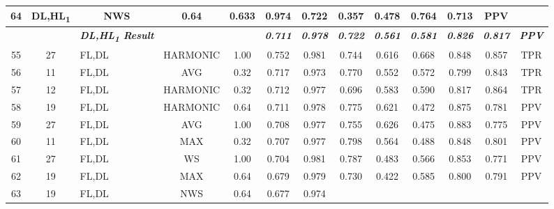\begin{table}[H]
{\begin{tabular}{cc|l|cc|c|c|c|c|c|c|c|c|}
    64 &
    DL,HL\textsubscript{1} &
    \multicolumn{1}{c|}{NWS} &
    0.64 &
    0.633 &
    0.974 &
    0.722 &
    0.357 &
    0.478 &
    0.764 &
    0.713 &
    PPV \\ \hline
   &
    \textit{\textbf{}} &
    \textit{\textbf{DL,HL\textsubscript{1} Result}} &
     &
     &
    \textit{\textbf{0.711}} &
    \textit{\textbf{0.978}} &
    \textit{\textbf{0.722}} &
    \textit{\textbf{0.561}} &
    \textit{\textbf{0.581}} &
    \textit{\textbf{0.826}} &
    \textit{\textbf{0.817}} &
    \textit{\textbf{PPV}} \\ \hline
  \multicolumn{1}{|c|}{55} &
    27 &
    FL,DL &
    \multicolumn{1}{c|}{HARMONIC} &
    1.00 &
    0.752 &
    0.981 &
    0.744 &
    0.616 &
    0.668 &
    0.848 &
    0.857 &
    TPR \\ \hline
  \multicolumn{1}{|c|}{56} &
    11 &
    FL,DL &
    \multicolumn{1}{c|}{AVG} &
    0.32 &
    0.717 &
    0.973 &
    0.770 &
    0.552 &
    0.572 &
    0.799 &
    0.843 &
    TPR \\ \hline
  \multicolumn{1}{|c|}{57} &
    12 &
    FL,DL &
    \multicolumn{1}{c|}{HARMONIC} &
    0.32 &
    0.712 &
    0.977 &
    0.696 &
    0.583 &
    0.590 &
    0.817 &
    0.864 &
    TPR \\ \hline
  \multicolumn{1}{|c|}{58} &
    19 &
    FL,DL &
    \multicolumn{1}{c|}{HARMONIC} &
    0.64 &
    0.711 &
    0.978 &
    0.775 &
    0.621 &
    0.472 &
    0.875 &
    0.781 &
    PPV \\ \hline
  \multicolumn{1}{|c|}{59} &
    27 &
    FL,DL &
    \multicolumn{1}{c|}{AVG} &
    1.00 &
    0.708 &
    0.977 &
    0.755 &
    0.626 &
    0.475 &
    0.883 &
    0.775 &
    PPV \\ \hline
  \multicolumn{1}{|c|}{60} &
    11 &
    FL,DL &
    \multicolumn{1}{c|}{MAX} &
    0.32 &
    0.707 &
    0.977 &
    0.798 &
    0.564 &
    0.488 &
    0.848 &
    0.801 &
    PPV \\ \hline
  \multicolumn{1}{|c|}{61} &
    27 &
    FL,DL &
    \multicolumn{1}{c|}{WS} &
    1.00 &
    0.704 &
    0.981 &
    0.787 &
    0.483 &
    0.566 &
    0.853 &
    0.771 &
    PPV \\ \hline
  \multicolumn{1}{|c|}{62} &
    19 &
    FL,DL &
    \multicolumn{1}{c|}{MAX} &
    0.64 &
    0.679 &
    0.979 &
    0.730 &
    0.422 &
    0.585 &
    0.800 &
    0.791 &
    PPV \\ \hline
  \multicolumn{1}{|c|}{63} &
    19 &
    FL,DL &
    \multicolumn{1}{c|}{NWS} &
    0.64 &
    0.677 &
    0.974 &

\end{tabular}}
\end{table}
